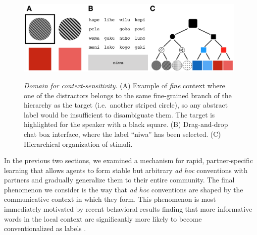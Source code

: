 
\begin{figure}[t]
\begin{center}
{\includegraphics[scale=.63]{./figures/Sec2-design.png}}
{\caption{{\emph{Domain for context-sensitivity.} (A) Example of \emph{fine} context where one of the distractors belongs to the same fine-grained branch of the hierarchy as the target (i.e.\ another striped circle), so any abstract label would be insufficient to disambiguate them. The target is highlighted for the speaker with a black square. (B) Drag-and-drop chat box interface, where the label ``niwa'' has been selected. (C) Hierarchical organization of stimuli.\label{fig:context_design}}}}
\vspace{-2ex}
\end{center}
\end{figure}

In the previous two sections, we examined a mechanism for rapid, partner-specific learning that allows agents to form stable but arbitrary \emph{ad hoc} conventions with partners and gradually generalize them to their entire community. 
The final phenomenon we consider is the way that \emph{ad hoc} conventions are shaped by the communicative context in which they form.
This phenomenon is most immediately motivated by recent behavioral results finding that more informative words in the local context are significantly more likely to become conventionalized as labels \cite{hawkins2020characterizing}.


